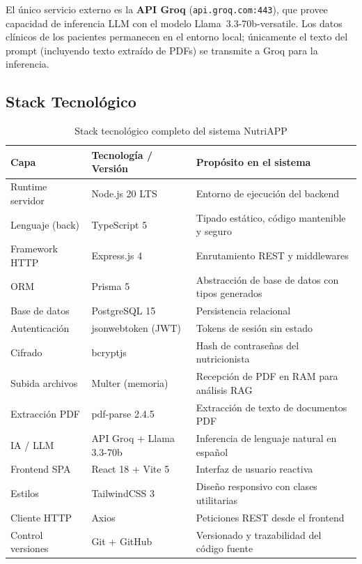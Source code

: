 \documentclass[12pt,a4paper]{article}
\begin{document}
El único servicio externo es la \textbf{API Groq} (\texttt{api.groq.com:443}), que
provee capacidad de inferencia LLM con el modelo Llama~3.3-70b-versatile. Los datos
clínicos de los pacientes permanecen en el entorno local; únicamente el texto del
prompt (incluyendo texto extraído de PDFs) se transmite a Groq para la inferencia.

\subsection{Stack Tecnológico}

\begin{table}[H]
\centering
\caption{Stack tecnológico completo del sistema NutriAPP}
\label{tab:stack}
\begin{tabularx}{\linewidth}{|l|l|X|}
\hline
\textbf{Capa} & \textbf{Tecnología / Versión} & \textbf{Propósito en el sistema} \\
\hline
Runtime servidor  & Node.js 20 LTS             & Entorno de ejecución del backend \\
\hline
Lenguaje (back)   & TypeScript 5               & Tipado estático, código mantenible y seguro \\
\hline
Framework HTTP    & Express.js 4               & Enrutamiento REST y middlewares \\
\hline
ORM               & Prisma 5                   & Abstracción de base de datos con tipos generados \\
\hline
Base de datos     & PostgreSQL 15              & Persistencia relacional \\
\hline
Autenticación     & jsonwebtoken (JWT)         & Tokens de sesión sin estado \\
\hline
Cifrado           & bcryptjs                   & Hash de contraseñas del nutricionista \\
\hline
Subida archivos   & Multer (memoria)           & Recepción de PDF en RAM para análisis RAG \\
\hline
Extracción PDF    & pdf-parse 2.4.5            & Extracción de texto de documentos PDF \\
\hline
IA / LLM          & API Groq + Llama 3.3-70b  & Inferencia de lenguaje natural en español \\
\hline
Frontend SPA      & React 18 + Vite 5          & Interfaz de usuario reactiva \\
\hline
Estilos           & TailwindCSS 3              & Diseño responsivo con clases utilitarias \\
\hline
Cliente HTTP      & Axios                      & Peticiones REST desde el frontend \\
\hline
Control versiones & Git + GitHub               & Versionado y trazabilidad del código fuente \\
\hline
\end{tabularx}
\end{table}
\end{document}
